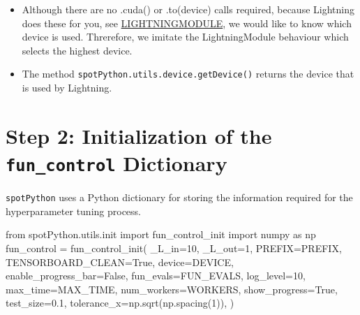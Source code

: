\documentclass[
  letterpaper,
  DIV=11,
  numbers=noendperiod]{scrreprt}
\newenvironment{Shaded}{\begin{snugshade}}{\end{snugshade}}
\newcommand{\DecValTok}[1]{\textcolor[rgb]{0.68,0.00,0.00}{#1}}
\newcommand{\FloatTok}[1]{\textcolor[rgb]{0.68,0.00,0.00}{#1}}
\newcommand{\ImportTok}[1]{\textcolor[rgb]{0.00,0.46,0.62}{#1}}
\newcommand{\NormalTok}[1]{\textcolor[rgb]{0.00,0.23,0.31}{#1}}
\newcommand{\OperatorTok}[1]{\textcolor[rgb]{0.37,0.37,0.37}{#1}}
\newcommand{\VariableTok}[1]{\textcolor[rgb]{0.07,0.07,0.07}{#1}}
\providecommand{\tightlist}{%
  \setlength{\itemsep}{0pt}\setlength{\parskip}{0pt}}\usepackage{longtable,booktabs,array}
\begin{document}
\begin{tcolorbox}[enhanced jigsaw, coltitle=black, bottomrule=.15mm, breakable, toprule=.15mm, colframe=quarto-callout-note-color-frame, title=\textcolor{quarto-callout-note-color}{\faInfo}\hspace{0.5em}{Note: Device selection}, colbacktitle=quarto-callout-note-color!10!white, opacityback=0, left=2mm, leftrule=.75mm, colback=white, rightrule=.15mm, bottomtitle=1mm, toptitle=1mm, titlerule=0mm, arc=.35mm, opacitybacktitle=0.6]

\begin{itemize}
\tightlist
\item
  Although there are no .cuda() or .to(device) calls required, because
  Lightning does these for you, see
  \href{https://lightning.ai/docs/pytorch/stable/common/lightning_module.html}{LIGHTNINGMODULE},
  we would like to know which device is used. Threrefore, we imitate the
  LightningModule behaviour which selects the highest device.
\item
  The method \texttt{spotPython.utils.device.getDevice()} returns the
  device that is used by Lightning.
\end{itemize}

\end{tcolorbox}

\section{\texorpdfstring{Step 2: Initialization of the
\texttt{fun\_control}
Dictionary}{Step 2: Initialization of the fun\_control Dictionary}}\label{step-2-initialization-of-the-fun_control-dictionary}

\texttt{spotPython} uses a Python dictionary for storing the information
required for the hyperparameter tuning process.

\begin{Shaded}
\begin{Highlighting}[]
\ImportTok{from}\NormalTok{ spotPython.utils.init }\ImportTok{import}\NormalTok{ fun\_control\_init}
\ImportTok{import}\NormalTok{ numpy }\ImportTok{as}\NormalTok{ np}
\NormalTok{fun\_control }\OperatorTok{=}\NormalTok{ fun\_control\_init(}
\NormalTok{    \_L\_in}\OperatorTok{=}\DecValTok{10}\NormalTok{,}
\NormalTok{    \_L\_out}\OperatorTok{=}\DecValTok{1}\NormalTok{,}
\NormalTok{    PREFIX}\OperatorTok{=}\NormalTok{PREFIX,}
\NormalTok{    TENSORBOARD\_CLEAN}\OperatorTok{=}\VariableTok{True}\NormalTok{,}
\NormalTok{    device}\OperatorTok{=}\NormalTok{DEVICE,}
\NormalTok{    enable\_progress\_bar}\OperatorTok{=}\VariableTok{False}\NormalTok{,}
\NormalTok{    fun\_evals}\OperatorTok{=}\NormalTok{FUN\_EVALS,}
\NormalTok{    log\_level}\OperatorTok{=}\DecValTok{10}\NormalTok{,}
\NormalTok{    max\_time}\OperatorTok{=}\NormalTok{MAX\_TIME,}
\NormalTok{    num\_workers}\OperatorTok{=}\NormalTok{WORKERS,}
\NormalTok{    show\_progress}\OperatorTok{=}\VariableTok{True}\NormalTok{,}
\NormalTok{    test\_size}\OperatorTok{=}\FloatTok{0.1}\NormalTok{,}
\NormalTok{    tolerance\_x}\OperatorTok{=}\NormalTok{np.sqrt(np.spacing(}\DecValTok{1}\NormalTok{)),}
\NormalTok{    )}
\end{Highlighting}
\end{Shaded}
\end{document}

